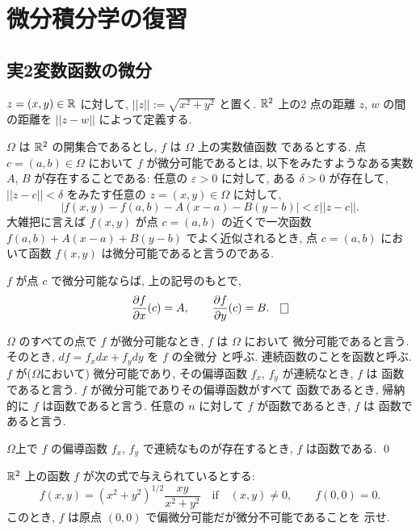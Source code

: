 \documentclass[12pt,twoside]{jarticle}
\begin{document}

\section{微分積分学の復習}


\subsection{実2変数函数の微分}

$z=(x,y)\in{\mathbb R}$ に対して, $||z||:=\sqrt{x^2+y^2}$ と置く. ${\mathbb R}^2$ 上の2
点の距離 $z$, $w$ の間の距離を $||z-w||$ によって定義する.

$\Omega$ は ${\mathbb R}^2$ の開集合であるとし, $f$ は $\Omega$ 上の実数値函数
であるとする. 点 $c=(a,b)\in\Omega$ において $f$ が微分可能であるとは, 
以下をみたすようなある実数 $A$, $B$ が存在することである: 任意の 
$\varepsilon>0$ に対して, ある $\delta>0$ が存在して, $||z - c||<\delta$ 
をみたす任意の $z=(x,y)\in\Omega$ に対して,
\[
  |f(x,y) - f(a,b) - A(x - a) - B(y - b)| < \varepsilon ||z - c||.
\]%
大雑把に言えば $f(x,y)$ が点 $c=(a,b)$ の近くで一次函数 %
$f(a,b) + A(x-a) + B(y-b)$ でよく近似されるとき, 
点 $c=(a,b)$ において函数 $f(x,y)$ は微分可能であると言うのである. 

\begin{question}
  $f$ が点 $c$ で微分可能ならば, 上の記号のもとで,
  \[
    \frac{\del f}{\del x}(c) = A,
    \qquad
    \frac{\del f}{\del y}(c) = B. \qed
  \]%
\end{question}

$\Omega$ のすべての点で $f$ が微分可能なとき, $f$ は $\Omega$ において
微分可能であると言う. そのとき, $df = f_x dx + f_y dy$ を $f$ の全微分
と呼ぶ. 連続函数のことを函数と呼ぶ. $f$ が($\Omega$において)
微分可能であり, その偏導函数 $f_x$, $f_y$ が連続なとき, $f$ は
函数であると言う. $f$ が微分可能でありその偏導函数がすべて
函数であるとき, 帰納的に $f$ は函数であると言う. 
任意の $n$ に対して $f$ が函数であるとき, $f$ は
\Class{\infty}函数であると言う.

\begin{question}
  $\Omega$上で $f$ の偏導函数 $f_x$, $f_y$ で連続なものが存在するとき,
  $f$ は函数である. \qed
\end{question}

\begin{question}
  ${\mathbb R}^2$ 上の函数 $f$ が次の式で与えられているとする:
  \[
    f(x,y) = (x^2+y^2)^{1/2} \frac{xy}{x^2+y^2} 
    \quad\text{if}\quad (x,y) \ne 0,
    \qquad
    f(0,0) = 0.
  \]%
  このとき, $f$ は原点 $(0,0)$ で偏微分可能だが微分不可能であることを
  示せ.
\end{question}
\end{document}
